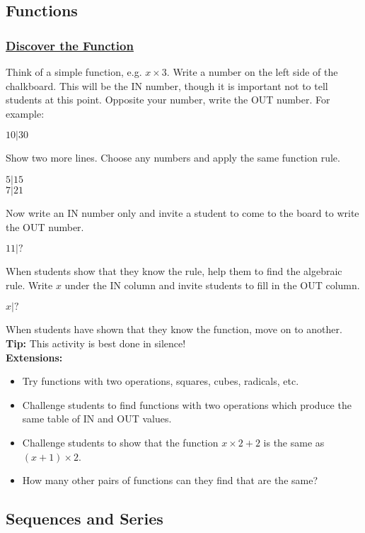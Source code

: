 	\subsection{Functions} \label{classactsfns}
	
		\subsubsection{\underline{Discover the Function}}
		Think of a simple function, e.g. $x \times 3$. Write a number on the left side of the chalkboard. This will be the IN number, though it is important not to tell students at this point. Opposite your number, write the OUT number. For example:
		\begin{center}
		$10 | 30$
\end{center}	
\noindent Show two more lines. Choose any numbers and apply the same function rule.
\begin{center}
$5 | 15$\\
$7 | 21$
\end{center}	
\noindent Now write an IN number only and invite a student to come to the board to write the OUT number.
\begin{center}
$11 | ?$
\end{center}
\noindent When students show that they know the rule, help them to find the algebraic rule. Write $x$ under the IN column and invite students to fill in the OUT column.
\begin{center}
$x | ?$
\end{center}
\noindent When students have shown that they know the function, move on to another.\\
\noindent\textbf{Tip:} This activity is best done in silence!\\

\noindent \textbf{Extensions:}
\begin{itemize}
\item Try functions with two operations, squares, cubes, radicals, etc.
\item Challenge students to find functions with two operations which produce the same table of IN and OUT values.
\item Challenge students to show that the function $x \times 2 + 2$ is the same as $(x +1) \times 2$.
\item How many other pairs of functions can they find that are the same?
\end{itemize}		
		
	\subsection{Sequences and Series} \label{classactsseqser}
	
